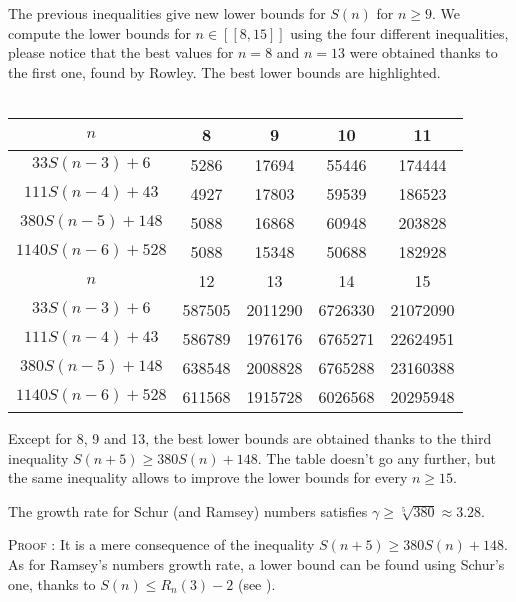 The previous inequalities give new lower bounds for \(S(n)\) for
\( n \geqslant 9 \). We compute the lower
bounds for \( n \in [\![8,15]\!] \) using the four different inequalities, please notice that the best values for \( n =
8\) and \(n = 13\) were obtained thanks to the first one, found by Rowley. The best lower bounds are highlighted.\\
\\
\begin{center}
\begin{tabular}{|*{5}{c|}}
    \hline
	\(n\) & 8 & 9 & 10 & 11 \\
	\hline
	\(33S(n-3) + 6 \) & \cellcolor{yellow} 5286 & 17694 & 55446 & 174444\\
	\hline
	\(111S(n-4) + 43 \) & 4927 & \cellcolor{yellow} 17803 & 59539 & 186523\\
	\hline
	\(380S(n-5) + 148 \) & 5088 & 16868 & \cellcolor{yellow} 60948 & \cellcolor{yellow} 203828 \\
	\hline
	\(1140S(n-6) + 528 \) & 5088 & 15348 & 50688 & 182928\\
	\hline
	\hline
	\(n\) & 12 & 13 & 14 & 15 \\
	\hline
	\(33S(n-3) + 6 \) & 587505 & \cellcolor{yellow} 2011290 & 6726330 & 21072090\\
	\hline
	\(111S(n-4) + 43 \) & 586789 & 1976176 & 6765271 & 22624951 \\
	\hline
\(380S(n-5) + 148 \) & \cellcolor{yellow} 638548 & 2008828 & \cellcolor{yellow} 6765288 & \cellcolor{yellow} 23160388 \\	\hline
	\(1140S(n-6) + 528 \) & 611568 & 1915728 & 6026568 & 20295948 \\
	\hline
\end{tabular}
\end{center}
Except for 8, 9 and 13, the best lower bounds are obtained thanks to
the third inequality \( S(n+5) \geqslant 380S(n) + 148\). The table
doesn't go any further, but the same inequality allows to improve the
lower bounds for every \( n \geqslant 15 \).

\begin{corollary}
The growth rate for Schur (and Ramsey) numbers satisfies \(\gamma \geqslant \sqrt[5]{380} \approx 3.28 \).
\end{corollary}
\textsc{Proof :} It is a mere consequence of the inequality \( S(n+5) \geqslant 380S(n) + 148\). As for Ramsey's
numbers growth rate, a lower bound can be found using Schur's one, thanks to \(S(n) \leqslant R_n(3)-2 \)
(see \cite{Schur1917}).
